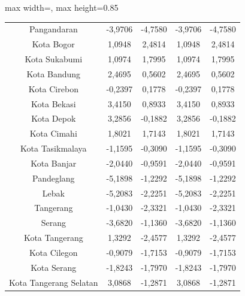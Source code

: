 \begin{table}[H]
\begin{adjustbox}{max width=\textwidth, max height=0.85\textheight}
\begin{tabular}{|c|c|c|c|c|}
Pangandaran & -3,9706 & -4,7580 & -3,9706 & -4,7580 \\
Kota Bogor & 1,0948 & 2,4814 & 1,0948 & 2,4814 \\
Kota Sukabumi & 1,0974 & 1,7995 & 1,0974 & 1,7995 \\
Kota Bandung & 2,4695 & 0,5602 & 2,4695 & 0,5602 \\
Kota Cirebon & -0,2397 & 0,1778 & -0,2397 & 0,1778 \\
Kota Bekasi & 3,4150 & 0,8933 & 3,4150 & 0,8933 \\
Kota Depok & 3,2856 & -0,1882 & 3,2856 & -0,1882 \\
Kota Cimahi & 1,8021 & 1,7143 & 1,8021 & 1,7143 \\
Kota Tasikmalaya & -1,1595 & -0,3090 & -1,1595 & -0,3090 \\
Kota Banjar & -2,0440 & -0,9591 & -2,0440 & -0,9591 \\
Pandeglang & -5,1898 & -1,2292 & -5,1898 & -1,2292 \\
Lebak & -5,2083 & -2,2251 & -5,2083 & -2,2251 \\
Tangerang & -1,0430 & -2,3321 & -1,0430 & -2,3321 \\
Serang & -3,6820 & -1,1360 & -3,6820 & -1,1360 \\
Kota Tangerang & 1,3292 & -2,4577 & 1,3292 & -2,4577 \\
Kota Cilegon & -0,9079 & -1,7153 & -0,9079 & -1,7153 \\
Kota Serang & -1,8243 & -1,7970 & -1,8243 & -1,7970 \\
Kota Tangerang Selatan & 3,0868 & -1,2871 & 3,0868 & -1,2871 \\
\hline
\end{tabular}
\end{adjustbox}
\end{table}